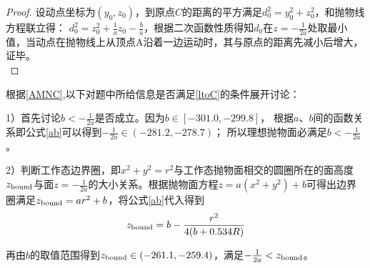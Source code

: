 \documentclass{myclass}
\begin{document}
\begin{proof}
		设动点坐标为$(y_0,z_0)$，到原点$C$的距离的平方满足$d_0^2 = y_0^2 + z_0^2$，和抛物线方程联立得：
		$d_0^2 = z_0^2 + \frac{1}{a}z_0 - \frac{b}{a}$，根据二次函数性质得知$d_0$在$z = -\frac{1}{2a}$处取最小值，当动点在抛物线上从顶点A沿着一边运动时，其与原点的距离先减小后增大，证毕。\\
		\label{ptoC}
\end{proof}\par 
根据\cref{AMNC},以下对题中所给信息是否满足\cref{ltoC}的条件展开讨论：\par 
1）首先讨论$b < -\frac{1}{2a}$是否成立。因为$b \in [-301.0 ,-299.8]$，
根据$a$、$b$间的函数关系即公式\cref{ab}可以得到$-\frac{1}{2a} \in (-281.2, -278.7)$；
所以理想抛物面必满足$b < -\frac{1}{2a}$。\par
2）判断工作态边界圈，即$x^2 + y^2 = r^2$与工作态抛物面相交的圆圈所在的面高度$z_{\rm{bound}}$与面$z = -\frac{1}{2a}$的大小关系。根据抛物面方程$z = a(x^2 + y^2)+b$可得出边界圈满足$z_{\rm{bound}} = ar^2 + b$，将公式\cref{ab}代入得到
\begin{equation}
		z_{\rm{bound}} = b - \frac{r^2}{4(b + 0.534R)}
		\label{bound}
\end{equation}\par 
再由$b$的取值范围得到$z_{\rm{bound}} \in (-261.1, -259.4)$，满足$ -\frac{1}{2a} < z_{\rm{bound}}$。
\end{document}
